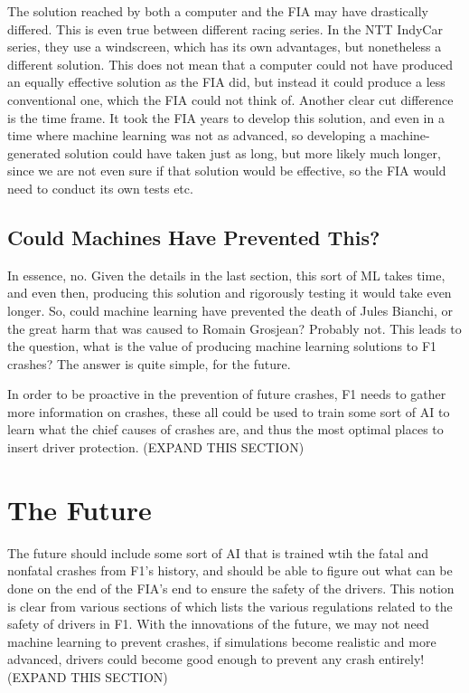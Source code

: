 \documentclass[letterpaper, 12pt]{article}
\numberwithin{figure}{section}
\begin{document}
The solution reached by both a computer and the FIA may have drastically differed. This is even true between different racing series. In the NTT IndyCar series, they use a windscreen, which has its own advantages, but nonetheless a different solution. This does not mean that a computer could not have produced an equally effective solution as the FIA did, but instead it could produce a less conventional one, which the FIA could not think of. Another clear cut difference is the time frame. It took the FIA years to develop this solution, and even in a time where machine learning was not as advanced, so developing a machine-generated solution could have taken just as long, but more likely much longer, since we are not even sure if that solution would be effective, so the FIA would need to conduct its own tests etc. 
\subsection{Could Machines Have Prevented This?}
In essence, no. Given the details in the last section, this sort of ML takes time, and even then, producing this solution and rigorously testing it would take even longer. So, could machine learning have prevented the death of Jules Bianchi, or the great harm that was caused to Romain Grosjean? Probably not. This leads to the question, what is the value of producing machine learning solutions to F1 crashes? The answer is quite simple, for the future.

In order to be proactive in the prevention of future crashes, F1 needs to gather more information on crashes, these all could be used to train some sort of AI to learn what the chief causes of crashes are, and thus the most optimal places to insert driver protection. (EXPAND THIS SECTION)
\section{The Future}
The future should include some sort of AI that is trained wtih the fatal and nonfatal crashes from F1's history, and should be able to figure out what can be done on the end of the FIA's end to ensure the safety of the drivers. This notion is clear from various sections of \cite{fia2021} which lists the various regulations related to the safety of drivers in F1. With the innovations of the future, we may not need machine learning to prevent crashes, if simulations become realistic and more advanced, drivers could become good enough to prevent any crash entirely! (EXPAND THIS SECTION)


\end{document}
